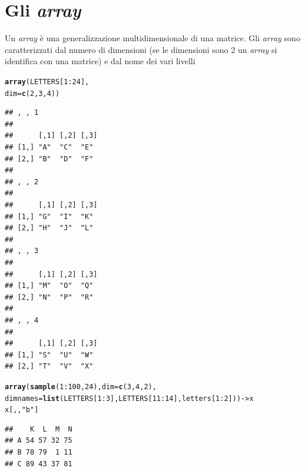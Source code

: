 \documentclass[onecolumn,12pt]{book}\usepackage[]{graphicx}\usepackage[]{color}
\makeatletter
\newcommand{\hlnum}[1]{\textcolor[rgb]{0.686,0.059,0.569}{#1}}%
\newcommand{\hlstr}[1]{\textcolor[rgb]{0.192,0.494,0.8}{#1}}%
\newcommand{\hlopt}[1]{\textcolor[rgb]{0,0,0}{#1}}%
\newcommand{\hlstd}[1]{\textcolor[rgb]{0.345,0.345,0.345}{#1}}%
\newcommand{\hlkwb}[1]{\textcolor[rgb]{0.69,0.353,0.396}{#1}}%
\newcommand{\hlkwc}[1]{\textcolor[rgb]{0.333,0.667,0.333}{#1}}%
\newcommand{\hlkwd}[1]{\textcolor[rgb]{0.737,0.353,0.396}{\textbf{#1}}}%
\newenvironment{kframe}{%
 \def\at@end@of@kframe{}%
 \ifinner\ifhmode%
  \def\at@end@of@kframe{\end{minipage}}%
  \begin{minipage}{\columnwidth}%
 \fi\fi%
 \def\FrameCommand##1{\hskip\@totalleftmargin \hskip-\fboxsep
 \colorbox{shadecolor}{##1}\hskip-\fboxsep
     \hskip-\linewidth \hskip-\@totalleftmargin \hskip\columnwidth}%
 \MakeFramed {\advance\hsize-\width
   \@totalleftmargin\z@ \linewidth\hsize
   \@setminipage}}%
 {\par\unskip\endMakeFramed%
 \at@end@of@kframe}
\newenvironment{knitrout}{}{} %
\makeatother
\begin{document}
\section{Gli \emph{array}}
Un \emph{array}  \`e una generalizzazione multidimensionale di una matrice. Gli \emph{array} sono caratterizzati dal numero di dimensioni  (se le dimensioni sono 2 un \emph{array} si identifica con una  matrice) e dal nome dei vari livelli
\begin{knitrout}
\color{fgcolor}\begin{kframe}
\begin{alltt}
\hlkwd{array}\hlstd{(LETTERS[}\hlnum{1}\hlopt{:}\hlnum{24}\hlstd{],}
\hlkwc{dim}\hlstd{=}\hlkwd{c}\hlstd{(}\hlnum{2}\hlstd{,}\hlnum{3}\hlstd{,}\hlnum{4}\hlstd{))}
\end{alltt}
\begin{verbatim}
## , , 1
## 
##      [,1] [,2] [,3]
## [1,] "A"  "C"  "E" 
## [2,] "B"  "D"  "F" 
## 
## , , 2
## 
##      [,1] [,2] [,3]
## [1,] "G"  "I"  "K" 
## [2,] "H"  "J"  "L" 
## 
## , , 3
## 
##      [,1] [,2] [,3]
## [1,] "M"  "O"  "Q" 
## [2,] "N"  "P"  "R" 
## 
## , , 4
## 
##      [,1] [,2] [,3]
## [1,] "S"  "U"  "W" 
## [2,] "T"  "V"  "X"
\end{verbatim}
\begin{alltt}
\hlkwd{array}\hlstd{(}\hlkwd{sample}\hlstd{(}\hlnum{1}\hlopt{:}\hlnum{100}\hlstd{,}\hlnum{24}\hlstd{),} \hlkwc{dim}\hlstd{=}\hlkwd{c}\hlstd{(}\hlnum{3}\hlstd{,}\hlnum{4}\hlstd{,}\hlnum{2}\hlstd{),}
      \hlkwc{dimnames}\hlstd{=}\hlkwd{list}\hlstd{(LETTERS[}\hlnum{1}\hlopt{:}\hlnum{3}\hlstd{],LETTERS[}\hlnum{11}\hlopt{:}\hlnum{14}\hlstd{],letters[}\hlnum{1}\hlopt{:}\hlnum{2}\hlstd{]))}\hlkwb{->}\hlstd{x}
\hlstd{x[,,}\hlstr{"b"}\hlstd{]}
\end{alltt}
\begin{verbatim}
##    K  L  M  N
## A 54 57 32 75
## B 78 79  1 11
## C 89 43 37 81
\end{verbatim}
\end{kframe}
\end{knitrout}
\end{document}
